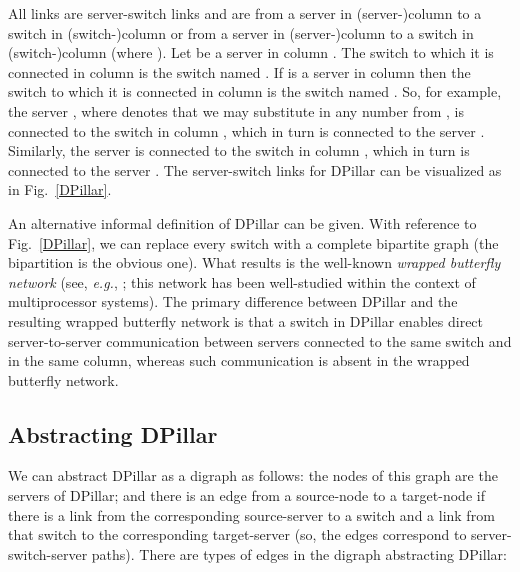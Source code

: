 \documentclass{article}
\begin{document}
All links are server-switch links and are from a server in (server-)column  to a switch in (switch-)column  or from a server in (server-)column  to a switch in (switch-)column  (where ). Let  be a server in column . The switch to which it is connected in column  is the switch named . If  is a server in column  then the switch to which it is connected in column  is the switch named . So, for example, the server , where  denotes that we may substitute in any number from , is connected to the switch  in column , which in turn is connected to the server . Similarly, the server  is connected to the switch  in column , which in turn is connected to the server . The server-switch links for DPillar can be visualized as in Fig.~\ref{DPillar}.

An alternative informal definition of DPillar can be given. With reference to Fig.~\ref{DPillar}, we can replace every switch with a complete bipartite graph  (the bipartition is the obvious one). What results is the well-known \emph{wrapped butterfly network\/} (see, \emph{e.g.}, \cite{Lei92}; this network has been well-studied within the context of multiprocessor systems). The primary difference between DPillar and the resulting wrapped butterfly network is that a switch in DPillar enables direct server-to-server communication between servers connected to the same switch and in the same column, whereas such communication is absent in the wrapped butterfly network.

\subsection{Abstracting DPillar}\label{subsect:absDPillar}

We can abstract DPillar as a digraph as follows: the nodes of this graph are the servers of DPillar; and there is an edge from a source-node to a target-node if there is a link from the corresponding source-server to a switch and a link from that switch to the corresponding target-server (so, the edges correspond to server-switch-server paths). There are  types of edges in the digraph abstracting DPillar:
\end{document}
